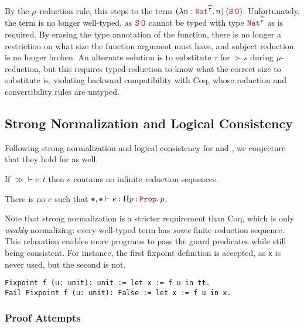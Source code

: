 By the $\mu$-reduction rule, this steps to the term $\app{(\abs{n}{\Nat^{\succ{\tau}}}{n})}{(\app{\Succ}{\Zero})}$.
Unfortunately, the term is no longer well-typed, as $\app{\Succ}{\Zero}$ cannot be typed with type $\Nat^{\succ{\tau}}$ as is required.
By erasing the type annotation of the function,
there is no longer a restriction on what size the function argument must have,
and subject reduction is no longer broken.
An alternate solution is to substitute $\tau$ for $\succ{s}$ during $\mu$-reduction,
but this requires typed reduction to know what the correct size to substitute is,
violating backward compatibility with Coq,
whose reduction and convertibility rules are untyped.

\subsection{Strong Normalization and Logical Consistency}\label{sec:metatheory:sn}

Following strong normalization and logical consistency for \CIChatminus and \CChatomega,
we conjecture that they hold for \lang as well.

\begin{conjecture}\label{thm:metatheory:sn}
  If $\gg \vdash e : t$ then $e$ contains no infinite
  reduction sequences.
\end{conjecture}

\begin{conjecture}\label{thm:metatheory:lc}
  There is no $e$ such that $\mt, \mt \vdash e : \prod{p}{\Prop}{p}$.
\end{conjecture}

Note that strong normalization is a stricter requirement than Coq, which is only \emph{weakly} normalizing:
every well-typed term has \emph{some} finite reduction sequence.
This relaxation enables more programs to pass the guard predicates while still being consistent.
For instance, the first fixpoint definition is accepted, as \texttt{x} is never used,
but the second is not.

\begin{verbatim}
Fixpoint f (u: unit): unit := let x := f u in tt.
Fail Fixpoint f (u: unit): False := let x := f u in x.
\end{verbatim}

\subsubsection{Proof Attempts}

